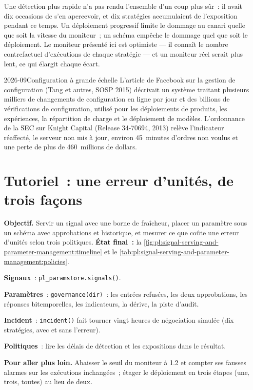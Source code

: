 \begin{remark}\label{rem:pl:signal-serving-and-parameter-management:detect}
Une détection plus rapide n'a pas rendu l'ensemble d'un coup plus sûr~: il avait dix occasions de s'en apercevoir, et dix stratégies accumulaient de l'exposition pendant ce temps. Un
déploiement progressif limite le dommage au canari quelle que soit la vitesse du moniteur~; un schéma empêche le dommage quel que soit le déploiement. Le moniteur présenté ici est
optimiste --- il connaît le nombre contrefactuel d'exécutions de chaque stratégie --- et un moniteur réel serait plus lent, ce qui élargit chaque écart.
\end{remark}

\begin{dated}{2026-09}{Configuration à grande échelle}\label{dat:pl:signal-serving-and-parameter-management:scale}
L'article de Facebook sur la gestion de configuration (Tang et autres, SOSP 2015) décrivait un système traitant plusieurs milliers de changements de configuration en ligne
par jour et des billions de vérifications de configuration, utilisé pour les déploiements de produits, les expériences, la répartition de charge et le déploiement de modèles. L'ordonnance de la SEC sur
Knight Capital (Release 34-70694, 2013) relève l'indicateur réaffecté, le serveur non mis à jour, environ 45~minutes d'ordres non voulus et une perte
de plus de 460~millions de dollars.
\end{dated}

\section{Tutoriel~: une erreur d'unités, de trois façons}\label{tut:pl:signal-serving-and-parameter-management:tut}

\begin{tutorial}
\textbf{Objectif.} Servir un signal avec une borne de fraîcheur, placer un paramètre sous un schéma avec approbations et historique, et mesurer ce que coûte une erreur
d'unités selon trois politiques. \textbf{État final~:} la \cref{fig:pl:signal-serving-and-parameter-management:timeline} et
le \cref{tab:pl:signal-serving-and-parameter-management:policies}.
\begin{tutsteps}
\item \textbf{Signaux}~: \texttt{pl\_paramstore.signals()}.
\item \textbf{Paramètres}~: \texttt{governance(dir)}~: les entrées refusées, les deux approbations, les réponses bitemporelles, les indicateurs, la dérive, la piste d'audit.
\item \textbf{Incident}~: \texttt{incident()} fait tourner vingt heures de négociation simulée (dix stratégies, avec et sans l'erreur).
\item \textbf{Politiques}~: lire les délais de détection et les expositions dans le résultat.
\end{tutsteps}
\textbf{Pour aller plus loin.} Abaisser le seuil du moniteur à 1.2 et compter ses fausses alarmes sur les exécutions inchangées~; étager le déploiement en trois
étapes (une, trois, toutes) au lieu de deux.
\end{tutorial}


